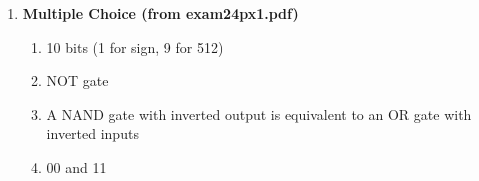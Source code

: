 \documentclass[11pt]{article}
\begin{document}
\begin{enumerate}[label=\textbf{C\arabic*.}]
  \item \textbf{Multiple Choice (from exam24px1.pdf)}
    \begin{enumerate}
        \item 10 bits (1 for sign, 9 for 512)
        \item NOT gate
        \item A NAND gate with inverted output is equivalent to an OR gate with inverted inputs
        \item 00 and 11
    \end{enumerate}

\end{enumerate}
\end{document}
